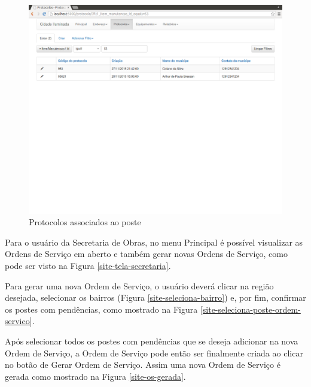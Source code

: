 \documentclass[
	article,			%
	11pt,				%
	oneside,			%
	a4paper,			%
	english,			%
	brazil,				%
	sumario=tradicional
	]{abntex2}
\begin{document}
\begin{figure}[!htbp]
 \centering
 \caption{\label{site-protocolos-poste}Protocolos associados ao poste}
 \includegraphics[scale=0.25]{site/6-protocolos_poste.png}
\end{figure}

\clearpage

Para o usuário da Secretaria de Obras, no menu Principal é possível visualizar as Ordens de Serviço
em aberto e também gerar novas Ordens de Serviço, como pode ser visto na Figura \ref{site-tela-secretaria}.

Para gerar uma nova Ordem de Serviço, o usuário deverá clicar na região desejada, selecionar os
bairros (Figura \ref{site-seleciona-bairro}) e, por fim, confirmar os postes com pendências, como
mostrado na Figura \ref{site-seleciona-poste-ordem-servico}.

Após selecionar todos os postes com pendências que se deseja adicionar na nova Ordem de Serviço, a
Ordem de Serviço pode então ser finalmente criada ao clicar no botão de Gerar Ordem de Serviço. Assim
uma nova Ordem de Serviço é gerada como mostrado na Figura \ref{site-os-gerada}.
\end{document}
